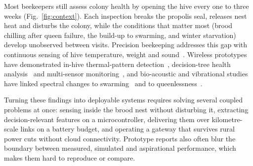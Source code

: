 \documentclass[conference]{IEEEtran}
\begin{document}
Most beekeepers still assess colony health by opening the hive every one to three weeks (Fig.~\ref{fig:context}). Each inspection breaks the propolis seal, releases nest heat and disturbs the colony, while the conditions that matter most (brood chilling after queen failure, the build-up to swarming, and winter starvation) develop unobserved between visits. Precision beekeeping addresses this gap with continuous sensing of hive temperature, weight and sound~\cite{zacepins2015,meikle2015}. Wireless prototypes have demonstrated in-hive thermal-pattern detection~\cite{kridi2016}, decision-tree health analysis~\cite{edwardsmurphy2016} and multi-sensor monitoring~\cite{cecchi2020}, and bio-acoustic and vibrational studies have linked spectral changes to swarming~\cite{ferrari2008,bencsik2011,ramsey2020} and to queenlessness~\cite{nolasco2018,ruvinga2023}.

Turning these findings into deployable systems requires solving several coupled problems at once: sensing inside the brood nest without disturbing it, extracting decision-relevant features on a microcontroller, delivering them over kilometre-scale links on a battery budget, and operating a gateway that survives rural power cuts without cloud connectivity. Prototype reports also often blur the boundary between measured, simulated and aspirational performance, which makes them hard to reproduce or compare.
\end{document}
